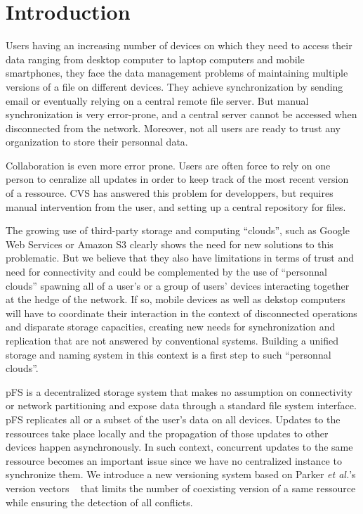 
\section{Introduction}

Users having an increasing number of devices on which they need to
access their data ranging from desktop computer to laptop computers
and mobile smartphones, they face the data management problems of
maintaining multiple versions of a file on different devices. They
achieve synchronization by sending email or eventually relying on a
central remote file server. But manual synchronization is very
error-prone, and a central server cannot be accessed when disconnected
from the network. Moreover, not all users are ready to trust any
organization to store their personnal data.

Collaboration is even more error prone. Users are often force to rely
on one person to cenralize all updates in order to keep track of the
most recent version of a ressource. CVS has answered this problem for
developpers, but requires manual intervention from the user, and
setting up a central repository for files.

The growing use of third-party storage and computing ``clouds'', such
as Google Web Services or Amazon S3 clearly shows the need for new
solutions to this problematic. But we believe that they also have
limitations in terms of trust and need for connectivity and could be
complemented by the use of ``personnal clouds'' spawning all of a
user's or a group of users' devices interacting together at the hedge
of the network. If so, mobile devices as well as dekstop computers
will have to coordinate their interaction in the context of
disconnected operations and disparate storage capacities, creating new
needs for synchronization and replication that are not answered by
conventional systems. Building a unified storage and naming system in
this context is a first step to such ``personnal clouds''.

pFS is a decentralized storage system that makes no assumption on
connectivity or network partitioning and expose data through a
standard file system interface. pFS replicates all or a
subset of the user's data on all devices. Updates to the ressources
take place locally and the propagation of those updates to other
devices happen asynchronously. In such context, concurrent updates to
the same ressource becomes an important issue since we have no
centralized instance to synchronize them. We introduce a new
versioning system based on Parker \emph{et al.}'s version vectors
~\cite{Parker1983} that limits the number of coexisting version of a
same ressource while ensuring the detection of all conflicts.

